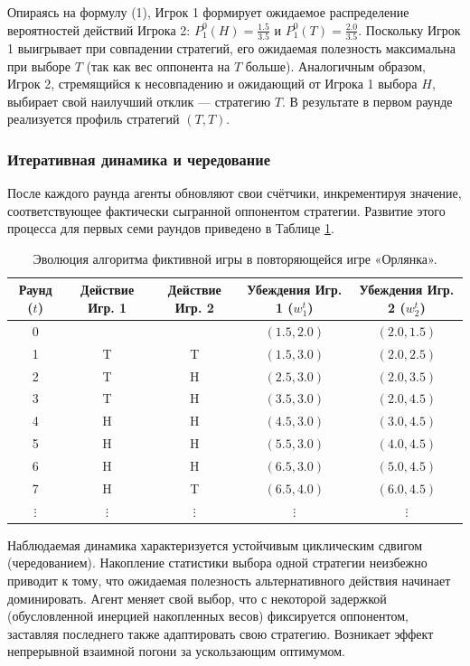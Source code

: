 Опираясь на формулу (1), Игрок 1 формирует ожидаемое распределение вероятностей действий Игрока 2: $P_1^0(H) = \frac{1.5}{3.5}$ и $P_1^0(T) = \frac{2.0}{3.5}$. 
Поскольку Игрок 1 выигрывает при совпадении стратегий, его ожидаемая полезность максимальна при выборе $T$ (так как вес оппонента на $T$ больше). Аналогичным образом, Игрок 2, стремящийся к несовпадению и ожидающий от Игрока 1 выбора $H$, выбирает свой наилучший отклик --- стратегию $T$. В результате в первом раунде реализуется профиль стратегий $(T, T)$.

\subsubsection{Итеративная динамика и чередование}

После каждого раунда агенты обновляют свои счётчики, инкрементируя значение, соответствующее фактически сыгранной оппонентом стратегии. Развитие этого процесса для первых семи раундов приведено в Таблице \ref{tab:fictitious_play_log}.

\begin{table}[h]
\centering
\begin{tabular}{ccccc}
\toprule
\textbf{Раунд ($t$)} & \textbf{Действие Игр. 1} & \textbf{Действие Игр. 2} & \textbf{Убеждения Игр. 1 ($w_1^t$)} & \textbf{Убеждения Игр. 2 ($w_2^t$)} \\
\midrule
0 &   &   & $(1.5, 2.0)$ & $(2.0, 1.5)$ \\
1 & T & T & $(1.5, 3.0)$ & $(2.0, 2.5)$ \\
2 & T & H & $(2.5, 3.0)$ & $(2.0, 3.5)$ \\
3 & T & H & $(3.5, 3.0)$ & $(2.0, 4.5)$ \\
4 & H & H & $(4.5, 3.0)$ & $(3.0, 4.5)$ \\
5 & H & H & $(5.5, 3.0)$ & $(4.0, 4.5)$ \\
6 & H & H & $(6.5, 3.0)$ & $(5.0, 4.5)$ \\
7 & H & T & $(6.5, 4.0)$ & $(6.0, 4.5)$ \\
$\vdots$ & $\vdots$ & $\vdots$ & $\vdots$ & $\vdots$ \\
\bottomrule
\end{tabular}
\caption{Эволюция алгоритма фиктивной игры в повторяющейся игре «Орлянка».}
\label{tab:fictitious_play_log}
\end{table}

Наблюдаемая динамика характеризуется устойчивым циклическим сдвигом (чередованием). Накопление статистики выбора одной стратегии неизбежно приводит к тому, что ожидаемая полезность альтернативного действия начинает доминировать. Агент меняет свой выбор, что с некоторой задержкой (обусловленной инерцией накопленных весов) фиксируется оппонентом, заставляя последнего также адаптировать свою стратегию. Возникает эффект непрерывной взаимной погони за ускользающим оптимумом.

